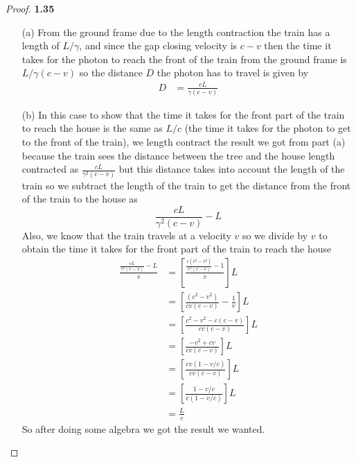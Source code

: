 \documentclass[11pt]{article}
\theoremstyle{definition}
\begin{document}
	\begin{proof}{\textbf{1.35}}
    \begin{itemize}
        \item [(a)] From the ground frame due to the length contraction the
        train has a length of $L/\gamma$, and since the gap closing velocity
        is $c-v$ then the time it takes for the photon to reach the front of
        the train from the ground frame is $L/\gamma(c-v)$ so the distance
        $D$ the photon has to travel is given by
        \begin{align*}
            D &= \frac{cL}{\gamma(c-v)}
        \end{align*}
        \item [(b)] In this case to show that the time it takes for the front
        part of the train to reach the house is the same as $L/c$ (the time it
        takes for the photon to get to the front of the train), we length
        contract the result we got from part (a) because the train sees the
        distance between the tree and the house length contracted as
        $\frac{cL}{\gamma^2(c-v)}$ but this distance takes into account the
        length of the train so we subtract the length of the train to get the
        distance from the front of the train to the house as
        $$\frac{cL}{\gamma^2(c-v)} - L$$        
        Also, we know that the train travels at a velocity $v$ so we divide by
        $v$ to obtain the time it takes for the front part of the train to
        reach the house
        \begin{align*}
            \frac{\frac{cL}{\gamma^2(c-v)} - L}{v}
                &= \left[\frac{\frac{c(c^2-v^2)}{c^2(c-v)} - 1}{v}\right]L \\
                &= \left[\frac{(c^2-v^2)}{cv(c-v)} - \frac{1}{v}\right]L \\
                &= \left[\frac{c^2-v^2 - c(c-v)}{cv(c-v)}\right]L \\
                &= \left[\frac{- v^2 + cv}{cv(c-v)}\right]L \\
                &= \left[\frac{cv(1 - v/c)}{cv(c-v)}\right]L \\
                &= \left[\frac{1 - v/c}{c(1 - v/c)}\right]L \\
                &= \frac{L}{c}
        \end{align*}
        So after doing some algebra we got the result we wanted.
    \end{itemize}
    \end{proof}
\cleardoublepage
\end{document}
